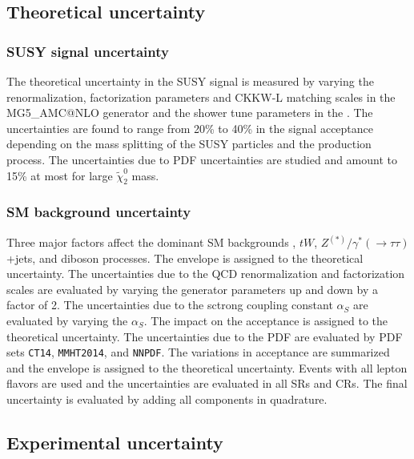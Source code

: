 
\subsection{Theoretical uncertainty}
\label{subsec:bkg_theoretical_uncertainty}


\subsubsection{SUSY signal uncertainty}
\label{subsubsec:bkg_susy_signal_uncertainty}
The theoretical uncertainty in the SUSY signal is measured by varying the renormalization, factorization parameters and CKKW-L matching scales in the MG5\_{\scriptsize A}MC@NLO
generator and the shower tune parameters in the {\PYTHIA}.
The uncertainties are found to range from 20\% to 40\% in the signal acceptance depending on the mass splitting of the SUSY particles and the production process.
The uncertainties due to PDF uncertainties are studied and amount to 15\% at most for large $\widetilde{\chi}^{0}_{2}$ mass.


\subsubsection{SM background uncertainty}
\label{subsubsec:bkg_sm_bkg_uncertainty}
Three major factors affect the dominant SM backgrounds \ttbar, $tW$, $Z^{(*)}/\gamma^{*}(\to \tau \tau)$+jets, and diboson processes.
The envelope is assigned to the theoretical uncertainty.
The uncertainties due to the QCD renormalization and factorization scales are evaluated by varying the generator parameters up and down by a factor of 2.
The uncertainties due to the sctrong coupling constant $\alpha_{S}$ are evaluated by varying the $\alpha_{S}$.
The impact on the acceptance is assigned to the theoretical uncertainty.
The uncertainties due to the PDF are evaluated by PDF sets \texttt{CT14}, \texttt{MMHT2014}, and \texttt{NNPDF}.
The variations in acceptance are summarized and the envelope is assigned to the theoretical uncertainty.
Events with all lepton flavors are used and the uncertainties are evaluated in all SRs and CRs.
The final uncertainty is evaluated by adding all components in quadrature.


\subsection{Experimental uncertainty}
\label{subsec:bkg_experimental_uncertainty}

